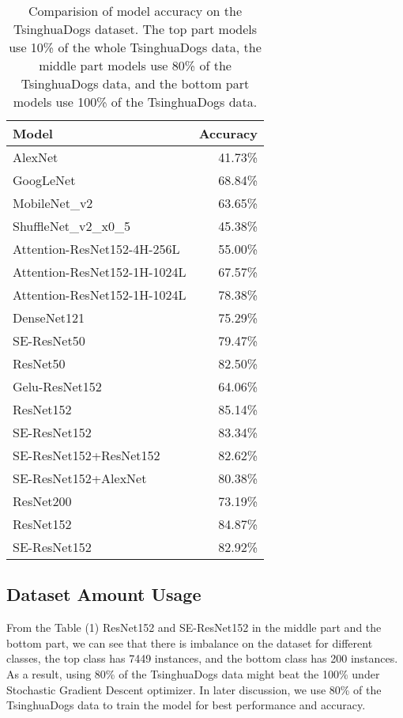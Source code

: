 \documentclass[runningheads]{llncs}
\begin{document}
\begin{table}
\begin{center}
\begin{tabular}{|l|r|}
\hline
Model   &  Accuracy \\
\hline
\hline
AlexNet & 41.73\%\\
GoogLeNet & 68.84\%\\
MobileNet\_v2 & 63.65\%\\
ShuffleNet\_v2\_x0\_5  &	45.38\% \\
Attention-ResNet152-4H-256L &  	55.00\% \\
Attention-ResNet152-1H-1024L &  	67.57\% \\
\hline
\hline
Attention-ResNet152-1H-1024L &  	78.38\% \\
DenseNet121   	&	75.29\% \\
SE-ResNet50 & 79.47\% \\
ResNet50 & 82.50\%\\
Gelu-ResNet152 &	64.06\% \\
ResNet152  	&	85.14\% \\
SE-ResNet152  	&	83.34\% \\
SE-ResNet152+ResNet152 & 82.62\% \\
SE-ResNet152+AlexNet & 80.38\% \\
ResNet200  	&	73.19\% \\
\hline
\hline
ResNet152  	&	84.87\% \\
SE-ResNet152  	&	82.92\% \\
\hline
\end{tabular}
\end{center}
\caption{Comparision of model accuracy on the TsinghuaDogs dataset. The top part models use 10\% of the whole TsinghuaDogs data, the middle part models use 80\% of the TsinghuaDogs data,
and the bottom part models use 100\% of the TsinghuaDogs data.}
\end{table}

\subsection{Dataset Amount Usage}

From the Table (1) ResNet152 and SE-ResNet152 in the middle part and the bottom part, we can see that there is imbalance on the dataset for different classes, the top class has 7449 instances,
and the bottom class has 200 instances.
As a result, using 80\% of the TsinghuaDogs data might beat the 100\% under Stochastic Gradient Descent optimizer.
In later discussion, we use 80\% of the TsinghuaDogs data to train the model for best performance and accuracy.
\end{document}
